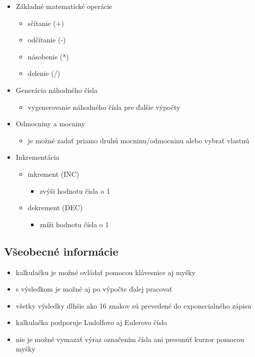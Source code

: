 \documentclass[a4paper, 11pt]{article}
\begin{document}
    \begin{itemize}
        \item Základné matematické operácie
        \begin{itemize}
            \item sčítanie (+)
            \item odčítanie (-)
            \item násobenie (*)
            \item delenie (/)
        \end{itemize}
        \item Generácia náhodného čísla
        \begin{itemize}
            \item vygenerovanie náhodného čísla pre ďalšie výpočty
        \end{itemize}
        \item Odmocniny a mocniny
        \begin{itemize}
            \item je možné zadať priamo druhú mocninu/odmocninu alebo vybrať vlastnú
        \end{itemize}
        \item Inkrementácia
        \begin{itemize}
            \item inkrement (INC)
            \begin{itemize}
                \item zvýši hodnotu čísla o 1
            \end{itemize}
            \item dekrement (DEC)
            \begin{itemize}
                \item zníži hodnotu čísla o 1
            \end{itemize}
        \end{itemize}
    \end{itemize}
    \newpage
    \subsection{Všeobecné informácie}
    \begin{itemize}
        \item kalkulačku je možné ovládať pomocou klávesnice aj myšky
        \item s výsledkom je možné aj po výpočte ďalej pracovať
        \item všetky výsledky dlhšie ako 16 znakov sú prevedené do exponecialného zápisu
        \item kalkulačka podporuje Ludolfovo aj Eulerovo číslo
        \item nie je možné vymazať výraz označením čísla ani presunúť kurzor pomocou myšky
    \end{itemize}
\end{document}
